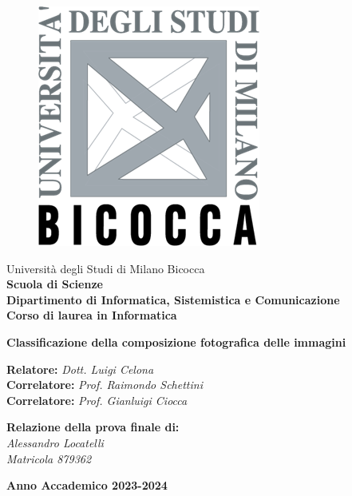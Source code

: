 \setlength\intextsep{0pt}
\thispagestyle{empty}

\begin{figure}
    \vspace{-0.25\baselineskip}
    \includegraphics[width=5\baselineskip]{Immagini/Altro/logo-bicocca.png}
\end{figure}

\noindent
Università degli Studi di Milano Bicocca \\[8pt]
\textbf{Scuola di Scienze} \\[8pt]
\textbf{Dipartimento di Informatica, Sistemistica e Comunicazione}\\[8pt]
\textbf{Corso di laurea in Informatica}

\vspace{30mm}

\begin{center}
    \Huge
    \textbf{Classificazione della composizione fotografica delle immagini}
\end{center}

\vspace{50mm}

\large
\noindent
\textbf{Relatore:} \textit{Dott. Luigi Celona} \\[7pt]
\textbf{Correlatore:} \textit{Prof. Raimondo Schettini} \\[7pt]
\textbf{Correlatore:} \textit{Prof. Gianluigi Ciocca} \\[20pt]

\begin{flushright}
    \textbf{Relazione della prova finale di:} \\[7pt]
    \textit{Alessandro Locatelli} \\[7pt]
    \textit{Matricola 879362}
\end{flushright}

\vspace{35mm}


\begin{center}
\textbf{Anno Accademico 2023-2024}
\end{center}
\newpage
